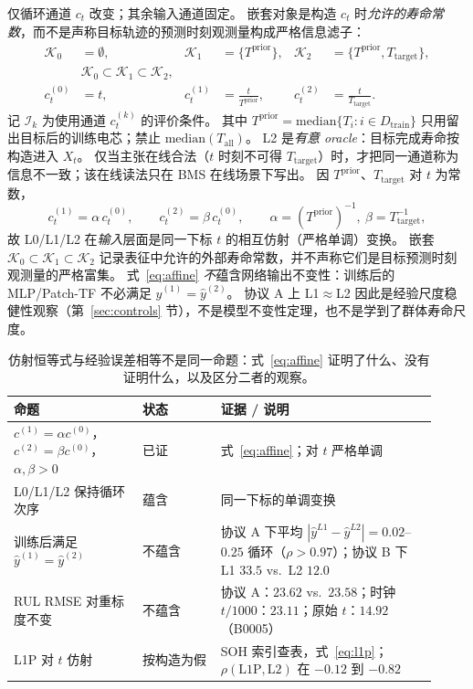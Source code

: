 \documentclass[UTF8,a4paper,12pt]{ctexart}
\begin{document}
仅循环通道 $c_t$ 改变；其余输入通道固定。
嵌套对象是构造 $c_t$ 时\emph{允许的寿命常数}，而不是声称目标轨迹的预测时刻观测量构成严格信息滤子：
\begin{equation}
\label{eq:nested}
\begin{aligned}
\mathcal{K}_0&=\emptyset,&
\mathcal{K}_1&=\{T^{\mathrm{prior}}\},&
\mathcal{K}_2&=\{T^{\mathrm{prior}},T_{\mathrm{target}}\},\\
&\mathcal{K}_0\subset\mathcal{K}_1\subset\mathcal{K}_2,\\
c_t^{(0)}&=t,&
c_t^{(1)}&=\frac{t}{T^{\mathrm{prior}}},&
c_t^{(2)}&=\frac{t}{T_{\mathrm{target}}}.
\end{aligned}
\end{equation}
记 $\mathcal{I}_k$ 为使用通道 $c_t^{(k)}$ 的评价条件。
其中 $T^{\mathrm{prior}}=\mathrm{median}\{T_i:i\in D_{\mathrm{train}}\}$ 只用留出目标后的训练电芯；禁止 $\mathrm{median}(T_{\mathrm{all}})$。
L2 是\emph{有意 oracle}：目标完成寿命按构造进入 $X_t$。
仅当主张在线合法（$t$ 时刻不可得 $T_{\mathrm{target}}$）时，才把同一通道称为信息不一致；该在线读法只在 BMS 在线场景下写出。
因 $T^{\mathrm{prior}}$、$T_{\mathrm{target}}$ 对 $t$ 为常数，
\begin{equation}
\label{eq:affine}
c_t^{(1)}=\alpha\,c_t^{(0)},\qquad
c_t^{(2)}=\beta\,c_t^{(0)},\qquad
\alpha=(T^{\mathrm{prior}})^{-1},\ \beta=T_{\mathrm{target}}^{-1},
\end{equation}
故 L0/L1/L2 在\emph{输入}层面是同一下标 $t$ 的相互仿射（严格单调）变换。
嵌套 $\mathcal{K}_0\subset\mathcal{K}_1\subset\mathcal{K}_2$ 记录表征中允许的外部寿命常数，并不声称它们是目标预测时刻观测量的严格富集。
式~\eqref{eq:affine} \emph{不}蕴含网络输出不变性：训练后的 MLP/Patch-TF 不必满足 $\hat y^{(1)}=\hat y^{(2)}$。
协议 A 上 L1$\approx$L2 因此是经验尺度稳健性观察（第~\ref{sec:controls} 节），不是模型不变性定理，也不是学到了群体寿命尺度。

\begin{table}[htbp]
\centering
\footnotesize
\caption{仿射恒等式与经验误差相等不是同一命题：式~\eqref{eq:affine} 证明了什么、没有证明什么，以及区分二者的观察。}
\label{tab:affine}
\setlength{\tabcolsep}{4pt}
\begin{tabular}{@{}p{0.28\linewidth}p{0.17\linewidth}p{0.47\linewidth}@{}}
\toprule
命题 & 状态 & 证据 / 说明 \\
\midrule
$c^{(1)}=\alpha c^{(0)}$，$c^{(2)}=\beta c^{(0)}$，$\alpha,\beta>0$ & 已证 & 式~\eqref{eq:affine}；对 $t$ 严格单调 \\
L0/L1/L2 保持循环次序 & 蕴含 & 同一下标的单调变换 \\
训练后满足 $\hat y^{(1)}=\hat y^{(2)}$ & 不蕴含 & 协议 A 下平均 $|\hat y^{L1}-\hat y^{L2}|=0.02$--$0.25$ 循环（$\rho>0.97$）；协议 B 下 L1 $33.5$ vs.\ L2 $12.0$ \\
RUL RMSE 对重标度不变 & 不蕴含 & 协议 A：$23.62$ vs.\ $23.58$；时钟 $t/1000$：$23.11$；原始 $t$：$14.92$（B0005） \\
L1P 对 $t$ 仿射 & 按构造为假 & SOH 索引查表，式~\eqref{eq:l1p}；$\rho(\mathrm{L1P},\mathrm{L2})$ 在 $-0.12$ 到 $-0.82$ \\
\bottomrule
\end{tabular}
\end{table}
\end{document}
